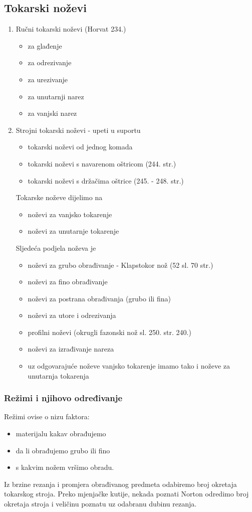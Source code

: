 \documentclass[a4paper,12pt]{article}
\numberwithin{figure}{section}
\begin{document}
\subsection{Tokarski noževi} 
\begin{enumerate}
\item Ručni tokarski noževi (Horvat 234.)
\begin{itemize}
\item za glađenje
\item za odrezivanje
\item za urezivanje
\item za unutarnji narez
\item za vanjski narez
\end{itemize}
\item Strojni tokarski noževi - upeti u suportu
\begin{itemize}
\item tokarski noževi od jednog komada
\item tokarski noževi s navarenom oštricom (244. str.)
\item tokarski noževi s držačima oštrice (245. - 248. str.)
\end{itemize}
Tokarske noževe dijelimo na 
\begin{itemize}
\item noževi za vanjsko tokarenje
\item noževi za unutarnje tokarenje
\end{itemize}
Sljedeća podjela noževa je
\begin{itemize}
\item noževi za grubo obrađivanje - Klapstokor nož (52 sl. 70 str.)
\item noževi za fino obrađivanje
\item noževi za postrana obrađivanja (grubo ili fina)
\item noževi za utore i odrezivanja
\item profilni noževi (okrugli fazonski nož sl. 250. str. 240.)
\item noževi za izrađivanje nareza
\item uz odgovarajuće noževe vanjsko tokarenje imamo tako i noževe za unutarnja tokarenja
\end{itemize}
\end{enumerate}
\subsubsection{Režimi i njihovo određivanje}
Režimi ovise o nizu faktora:
\begin{itemize}
\item materijalu kakav obrađujemo
\item da li obrađujemo grubo ili fino
\item s kakvim nožem vršimo obradu.
\end{itemize}
Iz brzine rezanja i promjera obrađivanog predmeta odabiremo broj okretaja tokarskog stroja. Preko mjenjačke kutije, nekada poznati Norton odredimo broj okretaja stroja i veličinu poznatu uz odabranu dubinu rezanja.
\end{document}
